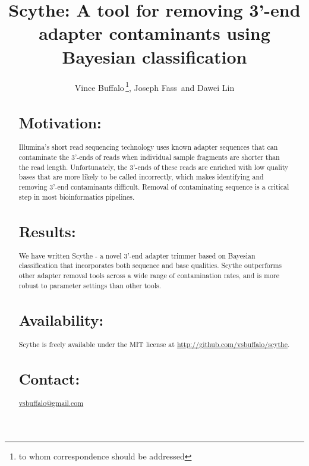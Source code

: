 \documentclass{bioinfo}
\begin{document}

\title[Scythe]{Scythe: A tool for removing 3'-end adapter contaminants using Bayesian classification}
\author[Buffalo \textit{et~al}]{Vince Buffalo\,\footnote{to whom correspondence should be addressed}, Joseph Fass\, and Dawei Lin}
\address{Bioinformatics Core, UC Davis Genome Center}



\maketitle

\begin{abstract}

\section{Motivation:}
Illumina's short read sequencing technology uses known adapter
sequences that can contaminate the 3'-ends of reads when individual
sample fragments are shorter than the read length. Unfortunately, the
3'-ends of these reads are enriched with low quality bases that are
more likely to be called incorrectly, which makes identifying and
removing 3'-end contaminants difficult. Removal of contaminating
sequence is a critical step in most bioinformatics pipelines.


\section{Results:} 
We have written Scythe - a novel 3'-end adapter trimmer based on
Bayesian classification that incorporates both sequence and base
qualities. Scythe outperforms other adapter removal tools across a
wide range of contamination rates, and is more robust to parameter
settings than other tools.


\section{Availability:}
Scythe is freely available under the MIT license at
\href{http://github.com/vsbuffalo/scythe}{http://github.com/vsbuffalo/scythe}.


\section{Contact:} \href{mailto:vsbuffalo@gmail.com}{vsbuffalo@gmail.com}
\end{abstract}
\end{document}
